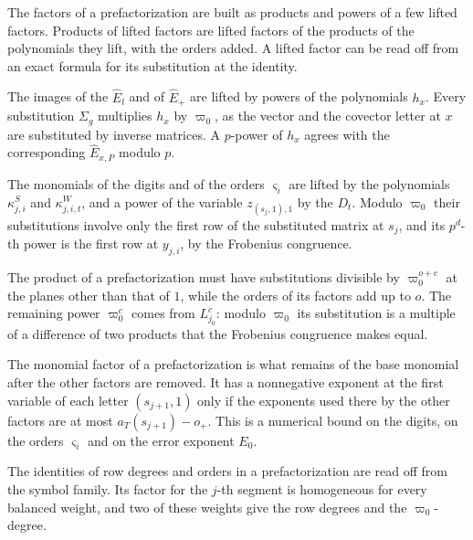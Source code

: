The factors of a prefactorization are built as products and powers of a few lifted factors. Products of lifted factors are
lifted factors of the products of the polynomials they lift, with the orders added. A lifted factor can be read off from an
exact formula for its substitution at the identity.

The images of the $\hat E_l$ and of $\hat E_+$ are lifted by powers of the polynomials $h_x$. Every substitution
$\Sigma_g$ multiplies $h_x$ by $\varpi_0$, as the vector and the covector letter at $x$ are substituted by inverse
matrices. A $p$-power of $h_x$ agrees with the corresponding $\hat E_{x,P}$ modulo $p$.

The monomials of the digits and of the orders $\varsigma_i$ are lifted by the polynomials $\kappa^S_{j,i}$ and
$\kappa^W_{j,i,t}$, and a power of the variable $z_{(s_j,1),1}$ by the $D_t$. Modulo $\varpi_0$ their substitutions involve
only the first row of the substituted matrix at $s_j$, and its $p^d$-th power is the first row at $y_{j,i}$, by the
Frobenius congruence.

The product of a prefactorization must have substitutions divisible by $\varpi_0^{o+c}$ at the planes other than that of
$1$, while the orders of its factors add up to $o$. The remaining power $\varpi_0^c$ comes from $L_{j_0}^c$: modulo
$\varpi_0$ its substitution is a multiple of a difference of two products that the Frobenius congruence makes equal.

The monomial factor of a prefactorization is what remains of the base monomial after the other factors are removed. It
has a nonnegative exponent at the first variable of each letter $(s_{j+1},1)$ only if the exponents used there by the other
factors are at most $a_T(s_{j+1})-o_+$. This is a numerical bound on the digits, on the orders $\varsigma_i$ and on the error
exponent $E_0$.

The identities of row degrees and orders in a prefactorization are read off from the symbol family. Its factor for the
$j$-th segment is homogeneous for every balanced weight, and two of these weights give the row degrees and the
$\varpi_0$-degree.

